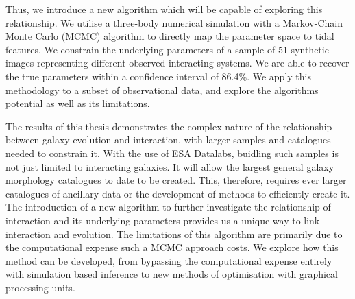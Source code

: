 \begin{abstracts}
Thus, we introduce a new algorithm which will be capable of exploring this relationship. We utilise a three-body numerical simulation with a Markov-Chain Monte Carlo (MCMC) algorithm to directly map the parameter space to tidal features. We constrain the underlying parameters of a sample of 51 synthetic images representing different observed interacting systems. We are able to recover the true parameters within a confidence interval of 86.4\%. We apply this methodology to a subset of observational data, and explore the algorithms potential as well as its limitations.

The results of this thesis demonstrates the complex nature of the relationship between galaxy evolution and interaction, with larger samples and catalogues needed to constrain it. With the use of ESA Datalabs, buidling such samples is not just limited to interacting galaxies. It will allow the largest general galaxy morphology catalogues to date to be created. This, therefore, requires ever larger catalogues of ancillary data or the development of methods to efficiently create it. The introduction of a new algorithm to further investigate the relationship of interaction and its underlying parameters provides us a unique way to link interaction and evolution. The limitations of this algorithm are primarily due to the computational expense such a MCMC approach costs. We explore how this method can be developed, from bypassing the computational expense entirely with simulation based inference to new methods of optimisation with graphical processing units.

\end{abstracts}



